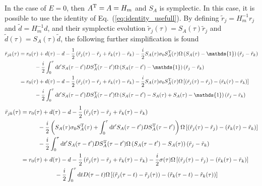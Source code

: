 \documentclass[%
reprint,
superscriptaddress,
nofootinbib,
 amsmath,amssymb,
prx,
floatfix,
]{revtex4-2}
\begin{document}
In the case of $E=0$, then  $A^{\rm T} = A = H_m$  and $S_A$ is symplectic. In this case, it is possible to use the identity of Eq.~(\ref{eq:identity_usefull}). By defining $\tilde{r}_j = H^{-1}_m r_j$ and $\tilde{d} = H^{-1}_m d$, and their symplectic evolution $\tilde{r}_j (\tau)= S_A(\tau)\tilde{r}_j$ and $\tilde{d} (\tau)= S_A(\tau)\tilde{d}$, the following further simplification is found
\begin{align*}
\bar{r}_{jk} (\tau) &= r_0(\tau) + d(\tau) - d - \frac{1}{2}  \left( \tilde{r}_j(\tau) - \tilde{r}_j + \tilde{r}_k(\tau) - \tilde{r}_k  \right) - 
    \frac{i}{2} S_A (\tau) \sigma_0 S_A^{\rm T} (\tau) \Omega \left( S_A (\tau) - \mathds{1}  \right) (\tilde{r}_j - \tilde{r}_k)   \\
    &\hspace{1cm}  - \frac{i}{2}  \int_0^{\tau} \text{d}t'  S_A(\tau- t') D S^{\rm T}_A(\tau - t') \Omega \left( S_A(\tau - t') - \mathds{1} \right) (\tilde{r}_j - \tilde{r}_k) \\
     &= r_0(\tau)  + d(\tau) - d - \frac{1}{2}  \left( \tilde{r}_j(\tau) - \tilde{r}_j + \tilde{r}_k(\tau) - \tilde{r}_k  \right) -
    \frac{i}{2} S_A (\tau) \sigma_0 S_A^{\rm T} (\tau) \Omega  \left[ (\tilde{r}_j(\tau) - \tilde{r}_j) - (\tilde{r}_k(\tau) - \tilde{r}_k)  \right]    \\
    &\hspace{1cm}  - \frac{i}{2}  \int_0^{\tau} \text{d}t'  S_A(\tau- t') D S^{\rm T}_A(\tau - t') \Omega \left( S_A(\tau - t') - S_A(\tau) + S_A(\tau) - \mathds{1} \right)  (\tilde{r}_j - \tilde{r}_k) 
 \end{align*}
\begin{align*}
\bar{r}_{jk} (\tau)    &= r_0(\tau)  + d(\tau) - d - \frac{1}{2}  \left( \tilde{r}_j(\tau) - \tilde{r}_j + \tilde{r}_k(\tau) - \tilde{r}_k  \right) \\
    &\hspace{1cm}- 
    \frac{i}{2} \left( S_A (\tau) \sigma_0 S_A^{\rm T} (\tau) + \int_0^{\tau} \text{d}t'  S_A(\tau- t') D S^{\rm T}_A(\tau - t') \right)\Omega  \left[ (\tilde{r}_j(\tau) - \tilde{r}_j) - (\tilde{r}_k(\tau) - \tilde{r}_k)  \right]    \\
    &\hspace{1cm}  - \frac{i}{2}  \int_0^{\tau} \text{d}t'  S_A(\tau- t') D S^{\rm T}_A(\tau - t') \Omega \left( S_A(\tau - t') - S_A(\tau) \right)  (\tilde{r}_j - \tilde{r}_k) \\
      &=  r_0(\tau)  + d(\tau) - d - \frac{1}{2}  \left( \tilde{r}_j(\tau) - \tilde{r}_j + \tilde{r}_k(\tau) - \tilde{r}_k  \right) - \frac{i}{2}  \sigma (\tau)  \Omega  \left[ (\tilde{r}_j (\tau) - \tilde{r}_j)  - (\tilde{r}_k (\tau) - \tilde{r}_k ) \right] \\
      & \hspace{2cm}  - \frac{i}{2}  \int_0^{\tau} \text{d}t  D (\tau-t) \Omega  \left[ (\tilde{r}_j(\tau - t) - \tilde{r}_j(\tau) ) -  (\tilde{r}_k(\tau - t) - \tilde{r}_k(\tau) ) \right] 
\end{align*}
\end{document}
